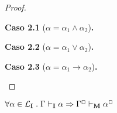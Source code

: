 \begin{proof}
\begin{case}
                \begin{case}
                    \textbf{Caso 2.1} ($\alpha = \alpha_1\wedge\alpha_2$)\textbf{.}
                \end{case}

                \begin{case}
                    \textbf{Caso 2.2} ($\alpha = \alpha_1\vee\alpha_2$)\textbf{.}
                \end{case}

                \begin{case}
                    \textbf{Caso 2.3} ($\alpha = \alpha_1\to\alpha_2$)\textbf{.}
                \end{case}
            \end{case}
        \end{proof}

        \begin{theorem}
            $\forall \alpha \in \mathcal{L}_\mathbf{I} \mathrel{.} \Gamma \vdash_\mathbf{I} \alpha \Rightarrow \Gamma^\Box \vdash_\mathbf{M} \alpha^\Box$
        \end{theorem}

